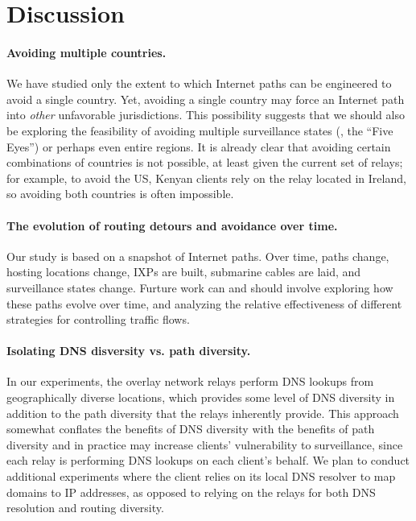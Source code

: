 \section{Discussion}
\label{discussion}

\paragraph{Avoiding multiple countries.} 
We have studied only the extent to which Internet paths can be
engineered to avoid a {single} country.  Yet, avoiding a single country
may force an Internet path into {\em other} unfavorable
jurisdictions. This possibility suggests that we should also be
exploring the feasibility of avoiding multiple surveillance states (\eg,
the ``Five Eyes'') or perhaps even entire regions. It is already clear
that avoiding certain combinations of countries is not possible, at
least given the current set of relays; for
example, to avoid the US, Kenyan clients rely on the relay located in
Ireland, so avoiding both countries is often impossible.

\paragraph{The evolution of routing detours and avoidance over time.}
Our study is based on a snapshot of Internet paths. Over time, paths
change, hosting locations change, IXPs are built, submarine cables are
laid, and surveillance states change.  Furture work can and should
involve exploring how these paths evolve over time, and analyzing the
relative effectiveness of different strategies for controlling traffic flows.

\paragraph{Isolating DNS disversity vs. path diversity.}
In our experiments, the overlay network relays perform DNS lookups from
geographically diverse locations, which provides some level of DNS
diversity in addition to the path diversity that the relays inherently
provide. This approach somewhat conflates the benefits of DNS diversity
with the benefits of path diversity and in practice may increase
clients' vulnerability to surveillance, since each relay is performing
DNS lookups on each client's behalf. We plan to conduct additional
experiments where the client relies on its local DNS resolver to map
domains to IP addresses, as opposed to relying on the relays for both
DNS resolution and routing diversity.
